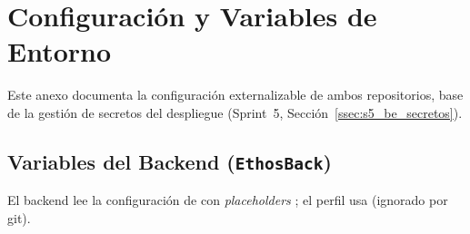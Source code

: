 \chapter{Configuración y Variables de Entorno}
\label{cap:anexo_config}

Este anexo documenta la configuración externalizable de ambos repositorios, base de la gestión
de secretos del despliegue (Sprint~5, Sección~\ref{ssec:s5_be_secretos}).\par

\section{Variables del Backend (\texttt{EthosBack})}
\label{sec:anexo_config_be}
El backend lee la configuración de  con \textit{placeholders}
; el perfil  usa 
(ignorado por git).

